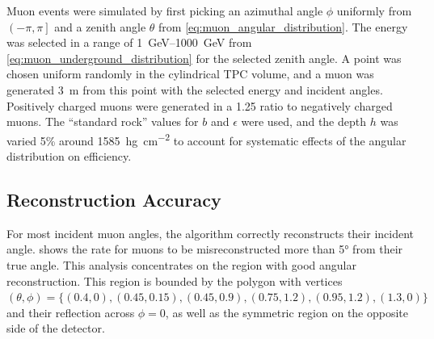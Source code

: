 \documentclass[herrin-thesis.tex]{subfiles}
\begin{document}
Muon events were simulated by first picking an azimuthal angle \(\phi\) uniformly from \(\left(-\pi, \pi\right]\) and a zenith angle \(\theta\) from \cref{eq:muon_angular_distribution}. The energy was selected in a range of \SIrange{1}{1000}{\GeV} from \cref{eq:muon_underground_distribution} for the selected zenith angle. A point was chosen uniform randomly in the cylindrical TPC volume, and a muon was generated \SI{3}{\meter} from this point with the selected energy and incident angles. Positively charged muons were generated in a 1.25 ratio to negatively charged muons. The ``standard rock'' values for \(b\) and \(\epsilon\) were used, and the depth \(h\) was varied 5\% around \SI{1585}{\hecto\gram\per\square\centi\meter} to account for systematic effects of the angular distribution on efficiency.

\subsection{Reconstruction Accuracy}
For most incident muon angles, the algorithm correctly reconstructs their incident angle.  shows the rate for muons to be misreconstructed more than \ang{5} from their true angle. This analysis concentrates on the region with good angular reconstruction. This region is bounded by the polygon with vertices \((\theta, \phi) = \{(0.4, 0), (0.45, 0.15), (0.45, 0.9), (0.75, 1.2), (0.95, 1.2), (1.3, 0)\}\) and their reflection  across \(\phi=0\), as well as the symmetric region on the opposite side of the detector.
\end{document}
